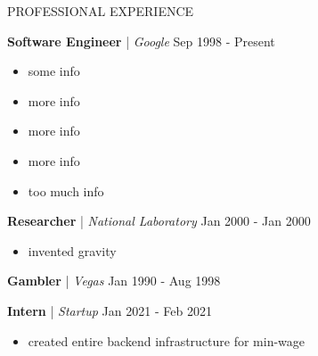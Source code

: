\begin{rSection}{PROFESSIONAL EXPERIENCE}

\quad\textbf{Software Engineer} | \textit{Google} \hfill Sep 1998 - Present\\
\begin{itemize}
    \itemsep -4pt {} \vspace{-1.5em}
        \item some info
        \item more info
        \item more info
        \item more info
        \item too much info
\end{itemize}

\quad\textbf{Researcher} | \textit{National Laboratory} \hfill Jan 2000 - Jan 2000\\
\begin{itemize}
    \itemsep -4pt {} \vspace{-1.5em}
        \item invented gravity
\end{itemize}

\quad\textbf{Gambler} | \textit{Vegas} \hfill Jan 1990 - Aug 1998\\
    \vspace{-1.25em}


\quad\textbf{Intern} | \textit{Startup} \hfill Jan 2021 - Feb 2021\\
\begin{itemize}
    \itemsep -4pt {} \vspace{-1.5em}
        \item created entire backend infrastructure for min-wage
\end{itemize}


\end{rSection}

